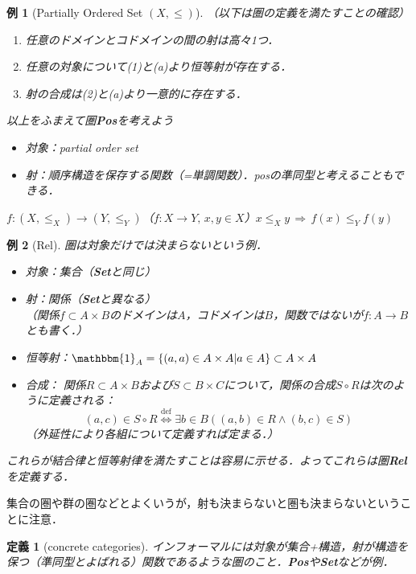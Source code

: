 \documentclass[dvipdfmx,a4j,10pt]{jsarticle}
\theoremstyle{mystyle1}
\theoremstyle{mystyle2}
\newtheorem{dfn*}{定義}
\newtheorem{example}{例}
\theoremstyle{mystyle3}
\renewcommand{\labelenumi}{\ensuremath{\blacksquare}}
\renewcommand{\labelenumi}{(\arabic{enumi})}%
\newcommand{\defLeftrightarrow}{\overset{\text{def}}{\iff}}
\begin{document}
\begin{example}[Partially Ordered Set $(X,\leq)$]
    （以下は圏の定義を満たすことの確認）
    \begin{enumerate}\renewcommand{\labelenumi}{(\alph{enumi})}
        \item 任意のドメインとコドメインの間の射は高々1つ．
        \item 任意の対象について(1)と(a)より恒等射が存在する．
        \item 射の合成は(2)と(a)より一意的に存在する．
    \end{enumerate}

    以上をふまえて圏\textbf{Pos}を考えよう
    \begin{itemize}
        \item 対象：partial order set
        \item 射：順序構造を保存する関数（=単調関数）．posの準同型と考えることもできる．
    \end{itemize}
    $f:(X,\leq_X)\to (Y,\leq_Y)$（$f:X\to Y,\, x,y\in X$）$x\leq_X y\,\Rightarrow\,f(x)\leq_Y f(y)$
\end{example}

\begin{example}[Rel]
    圏は対象だけでは決まらないという例．
    \begin{itemize}
        \item 対象：集合（\textbf{Set}と同じ）
        \item 射：関係（\textbf{Set}と異なる）\\
              （関係$f\subset A\times B$のドメインは$A$，コドメインは$B$，関数ではないが$f:A\to B$とも書く．）
        \item 恒等射：$\mathbbm{1}_A=\{(a,a)\in A\times A| a\in A\}\subset A\times A$
        \item 合成：
              関係$R\subset A\times B$および$S\subset B\times C$について，関係の合成$S\circ R$は次のように定義される：
              \[
                  (a,c)\in S\circ R \defLeftrightarrow \exists b\in B((a,b)\in R\land (b,c)\in S)
              \]
              （外延性により各組について定義すれば定まる．）
    \end{itemize}
    これらが結合律と恒等射律を満たすことは容易に示せる．よってこれらは圏\textbf{Rel}を定義する．
\end{example}

集合の圏や群の圏などとよくいうが，射も決まらないと圏も決まらないということに注意．

\begin{dfn*}[concrete categories]
    インフォーマルには対象が集合+構造，射が構造を保つ（準同型とよばれる）関数であるような圏のこと．\textbf{Pos}や\textbf{Set}などが例．
\end{dfn*}
\end{document}
